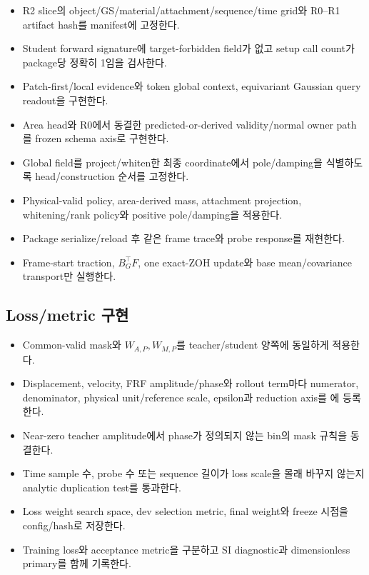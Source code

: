\documentclass[10pt]{article}
\begin{document}
\begin{itemize}
  \item[$\square$] R2 slice의 object/GS/material/attachment/sequence/time grid와 R0--R1 artifact hash를 manifest에 고정한다.
  \item[$\square$] Student forward signature에 target-forbidden field가 없고 setup call count가 package당 정확히 1임을 검사한다.
  \item[$\square$] Patch-first/local evidence와 token global context, equivariant Gaussian query readout을 구현한다.
  \item[$\square$] Area head와 R0에서 동결한 predicted-or-derived validity/normal owner path를 frozen schema axis로 구현한다.
  \item[$\square$] Global field를 project/whiten한 최종 coordinate에서 pole/damping을 식별하도록 head/construction 순서를 고정한다.
  \item[$\square$] Physical-valid policy, area-derived mass, attachment projection, whitening/rank policy와 positive pole/damping을 적용한다.
  \item[$\square$] Package serialize/reload 후 같은 frame trace와 probe response를 재현한다.
  \item[$\square$] Frame-start traction, \(B_G^\top F\), one exact-ZOH update와 base mean/covariance transport만 실행한다.
\end{itemize}

\subsection{Loss/metric 구현}

\begin{itemize}
  \item[$\square$] Common-valid mask와 \(W_{A,P},W_{M,P}\)를 teacher/student 양쪽에 동일하게 적용한다.
  \item[$\square$] Displacement, velocity, FRF amplitude/phase와 rollout term마다 numerator, denominator,
  physical unit/reference scale, epsilon과 reduction axis를 에 등록한다.
  \item[$\square$] Near-zero teacher amplitude에서 phase가 정의되지 않는 bin의 mask 규칙을 동결한다.
  \item[$\square$] Time sample 수, probe 수 또는 sequence 길이가 loss scale을 몰래 바꾸지 않는지 analytic duplication test를 통과한다.
  \item[$\square$] Loss weight search space, dev selection metric, final weight와 freeze 시점을 config/hash로 저장한다.
  \item[$\square$] Training loss와 acceptance metric을 구분하고 SI diagnostic과 dimensionless primary를 함께 기록한다.
\end{itemize}
\end{document}
